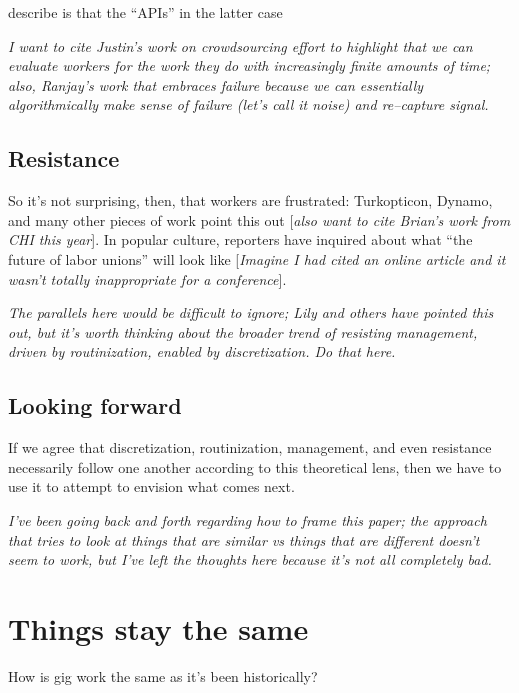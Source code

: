 \documentclass{sigchi}
\begin{document}
\citeauthor{storiesIraniSilberman} describe is that the ``APIs'' in the latter case



\textit{I want to cite Justin's work on crowdsourcing effort to highlight that
we can evaluate workers for the work they do with increasingly finite amounts of time;
also, Ranjay's work that embraces failure because
we can essentially algorithmically make sense of failure (let's call it noise)
and re--capture signal.}


\subsection{Resistance}
So it's not surprising, then, that workers are frustrated:
Turkopticon, Dynamo, and many other pieces of work point this out
\cite{turkopticon,dynamo,uberAlgorithm}
[\textit{also want to cite Brian's work from CHI this year}].
In popular culture, reporters have inquired about
what ``the future of labor unions'' will look like
[\textit{Imagine I had cited an online article and
it wasn't totally inappropriate for a conference}].

\textit{The parallels here would be difficult to ignore;
Lily and others have pointed this out,
but it's worth thinking about the broader trend of
resisting management,
driven by routinization,
enabled by discretization.
Do that here.}



\subsection{Looking forward}
If we agree that
discretization,
routinization,
management,
and even resistance
necessarily follow one another according to this theoretical lens,
then we have to use it to attempt to envision
what comes next.



\textit{I've been going back and forth regarding how to frame this paper;
the approach that tries to look at
things that are similar vs things that are different
doesn't seem to work, but
I've left the thoughts here because it's not all completely bad.}

\section{Things stay the same}
How is gig work the same as it's been historically?
\end{document}
